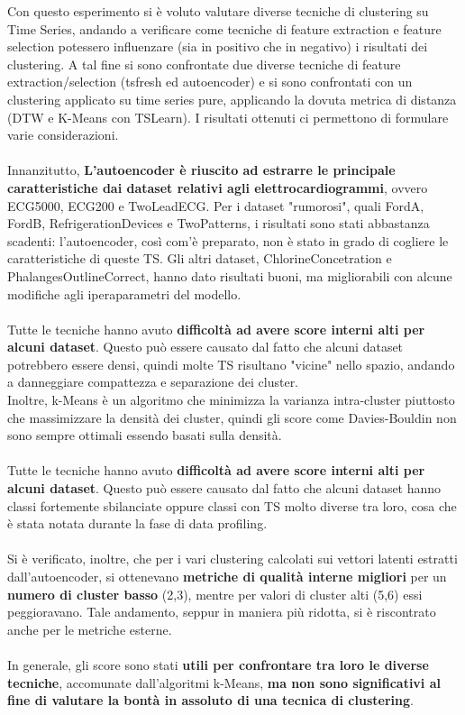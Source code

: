 Con questo esperimento si è voluto valutare diverse tecniche di clustering su Time Series, andando a verificare come tecniche di feature extraction e feature selection potessero influenzare (sia in positivo che in negativo) i risultati dei clustering.
A tal fine si sono confrontate due diverse tecniche di feature extraction/selection (tsfresh ed autoencoder) e si sono confrontati con un clustering applicato su time series pure, applicando la dovuta metrica di distanza (DTW e K-Means con TSLearn).
I risultati ottenuti ci permettono di formulare varie considerazioni.\\ 
\\
Innanzitutto, \textbf{L'autoencoder è riuscito ad estrarre le principale caratteristiche dai dataset relativi agli elettrocardiogrammi}, ovvero ECG5000, ECG200 e TwoLeadECG.
Per i dataset "rumorosi", quali FordA, FordB, RefrigerationDevices e TwoPatterns, i risultati sono stati abbastanza scadenti: l'autoencoder, così com'è preparato, non è stato in grado di cogliere le caratteristiche di queste TS.
Gli altri dataset, ChlorineConcetration e PhalangesOutlineCorrect, hanno dato risultati buoni, ma migliorabili con alcune modifiche agli iperaparametri del modello.\\
\\
Tutte le tecniche hanno avuto \textbf{difficoltà ad avere score interni alti per alcuni dataset}. Questo può essere causato dal fatto che alcuni dataset potrebbero essere densi, quindi molte TS risultano "vicine" nello spazio, andando a danneggiare compattezza e separazione dei cluster.\\
Inoltre, k-Means è un algoritmo che minimizza la varianza intra-cluster piuttosto che massimizzare la densità dei cluster, quindi gli score come Davies-Bouldin non sono sempre ottimali essendo basati sulla densità.\\
\\
Tutte le tecniche hanno avuto \textbf{difficoltà ad avere score interni alti per alcuni dataset}. Questo può essere causato dal fatto che alcuni dataset hanno classi fortemente sbilanciate oppure classi con TS molto diverse tra loro, cosa che è stata notata durante la fase di data profiling.\\
\\
Si è verificato, inoltre, che per i vari clustering calcolati sui vettori latenti estratti dall'autoencoder, si ottenevano \textbf{metriche di qualità interne migliori} per un\textbf{ numero di cluster basso} (2,3), mentre per valori di cluster alti (5,6) essi peggioravano.
Tale andamento, seppur in maniera più ridotta, si è riscontrato anche per le metriche esterne.\\
\\ 
In generale, gli score sono stati \textbf{utili per confrontare tra loro le diverse tecniche}, accomunate dall'algoritmi k-Means, \textbf{ma non sono significativi al fine di valutare la bontà in assoluto di una tecnica di clustering}.